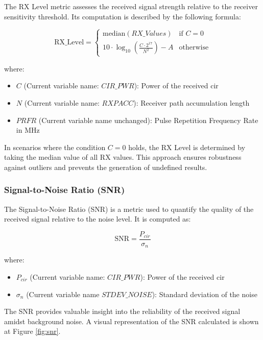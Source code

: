 The RX Level metric assesses the received signal strength relative to the receiver sensitivity threshold. Its computation is described by the following formula:

\begin{equation}
  \text{RX\_Level} =
  \begin{cases}
    \text{median}(RX\_Values) & \text{if } C = 0 \\
    10 \cdot \log_{10} \left( \frac{C \cdot 2^{17}}{N^2} \right) - A & \text{otherwise}
  \end{cases}
\end{equation}

where:

\begin{itemize}
  \item $C$ (Current variable name: $CIR\_PWR$): Power of the received \acrshort{cir}
  \item $N$ (Current variable name: $RXPACC$): Receiver path accumulation length
  \item $PRFR$ (Current variable name unchanged): Pulse Repetition Frequency Rate in MHz
\end{itemize}

In scenarios where the condition $C = 0$ holds, the RX Level is determined by taking the median value of all RX values. This approach ensures robustness against outliers and prevents the generation of undefined results.


\subsubsection{Signal-to-Noise Ratio (SNR)}\label{snr}

The Signal-to-Noise Ratio (SNR) is a metric used to quantify the quality of the received signal relative to the noise level. It is computed as:

\begin{equation}
  \text{SNR} = \frac{P_{cir}}{\sigma_n}
\end{equation}

where:

\begin{itemize}
  \item $P_{cir}$ (Current variable name: $CIR\_PWR$): Power of the received \acrshort{cir}
  \item $\sigma_n$ (Current variable name $STDEV\_NOISE$): Standard deviation of the noise
\end{itemize}

The SNR provides valuable insight into the reliability of the received signal amidst background noise. A visual representation of the SNR calculated is shown at Figure \ref{fig:snr}.

